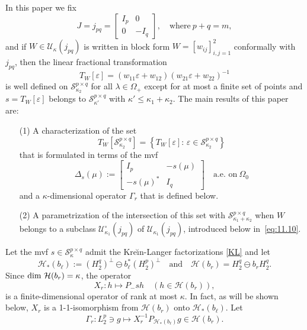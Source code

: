 \documentclass[12pt,twoside,a4paper]{amsart}
\theoremstyle{definition}
\numberwithin{equation}{section}
\begin{document}
In this paper we fix
$$
J=j_{pq}=\begin{bmatrix}I_p&0\\0&-I_q\end{bmatrix},\quad\text{where}\ p+q=m,
$$
and if $W\in{{\mathcal U}}_\kappa(j_{pq})$ is written in block form $W=[w_{ij}]_{i,j=1}^2$
conformally with
$j_{pq}$, then the linear fractional transformation
\begin{equation}\label{eq:0.9}
    T_W[\varepsilon]=(w_{11}\varepsilon+w_{12})(w_{21}\varepsilon+w_{22})^{-1}
\end{equation}
is well defined on
${\mathcal S}_{\kappa_2}^{p\times q}$ for all $\lambda\in\Omega_+$ except for at
most a finite set of
points and $s=T_W[\varepsilon]$ belongs to ${\mathcal S}_{\kappa'}^{p\times q}$ with
$\kappa'\le \kappa_1+\kappa_2$. The main results of this paper are:
\begin{enumerate}
\item[\rm(1)]   A
characterization of the set
\[
  T_W[{\mathcal S}_{\kappa_2}^{p\times q}]=\left\{T_W[\varepsilon]:\,\varepsilon\in
{\mathcal S}_{\kappa_2}^{p\times q}\right\}
\]
that is formulated in terms of the mvf
\[
\Delta_s(\mu):=\left[\begin{array}{cc}
I_p & -s(\mu)\\
-s(\mu)^* & I_q   \end{array} \right]  \quad \text{a.e. on}\ \Omega_0
\]
and a $\kappa$-dimensional operator $\Gamma_r$ that is defined below.
\vskip 6pt
\item[\rm(2)] A parametrization of the intersection of this set with
${\mathcal S}_{\kappa_1+\kappa_2}^{p\times q}$ when $W$ belongs to a
subclass ${{\mathcal U}}_{\kappa_1}^\circ(j_{pq})$ of ${{\mathcal U}}_{\kappa_1}(j_{pq})$,
introduced below in~\eqref{eq:11.10}.
\end{enumerate}

Let the mvf $s\in {\mathcal S}_{\kappa}^{p\times q}$ admit the
Kre\u{\i}n-Langer factorizations
\eqref{KL} and let
$$
{{\mathcal H}}_*(b_\ell):=(H_2^q)^\perp\ominus b_\ell^*(H_2^p)^\perp\quad\textrm{and}
\quad
{{\mathcal H}}(b_r)=H_2^q\ominus b_rH_2^q.
$$
Since  $\textup{dim } {{\mathcal H}}(b_r)=\kappa$, the operator
\[
    X_r:h\mapsto P_-sh\quad (h\in {{\mathcal H}}(b_r)),
\]
is a finite-dimensional operator of rank at most $\kappa$. In fact, as will
be shown below, $X_r$ is a
1-1-isomorphism from ${{\mathcal H}}(b_r)$ onto ${{\mathcal H}}_*(b_{\ell})$. Let
    \[
     \Gamma_r:L_2^p\ni g\mapsto X_r^{-1}P_{{{\mathcal H}}_*(b_{\ell})}g\in{{\mathcal H}}(b_r).
    \]
\end{document}
